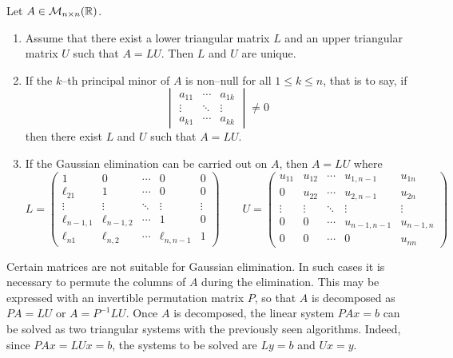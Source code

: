 \begin{theorem}
	Let $A \in \mathcal{M}_{n \times n}(\mathbb{R})$.
	\begin{enumerate}[label={(\arabic*)}, topsep=0pt]
		\item Assume that there exist a lower triangular matrix $L$ and an
		upper triangular matrix $U$ such that $A = L U$. Then $L$ and $U$ are
		unique.
        \item If the $k$--th principal minor of $A$ is non--null for all $1 \leq
        k \leq n$, that is to say, if
        \begin{equation}
            \begin{vmatrix}
                a_{11} & \cdots & a_{1k} \\
                \vdots & \ddots & \vdots \\
                a_{k1} & \cdots & a_{kk}
            \end{vmatrix} \neq 0
        \end{equation}
        then there exist $L$ and $U$ such that $A = L U$.
        \item If the Gaussian elimination can be carried out on $A$, then $A = L U$ where
		\[			
			L = 
			\begin{pmatrix}
				1 				& 0 			& \cdots & 0 				& 0  \\
				\ell_{21} 		& 1 			& \cdots & 0 				& 0 \\
				\vdots 			& \vdots 		& \ddots & \vdots 	  		& \vdots \\
				\ell_{n-1,1} 	& \ell_{n-1,2} 	& \cdots & 1 				& 0 \\
				\ell_{n1} 		& \ell_{n,2} 	& \cdots & \ell_{n,n-1} 	& 1
			\end{pmatrix}
			\qquad			
			U = 
			\begin{pmatrix}
				u_{11} 	& u_{12} & \cdots & u_{1,n-1} & u_{1n} \\
				0		& u_{22} & \cdots & u_{2,n-1} & u_{2n} \\
				\vdots	& \vdots & \ddots & \vdots 	  & \vdots \\
				0 		& 0		 & \cdots & u_{n-1,n-1} & u_{n-1,n} \\
				0 	   	& 0		 & \cdots & 0 			& u_{nn}
			\end{pmatrix}			
		\] 
	\end{enumerate}
\end{theorem}

Certain matrices are not suitable for Gaussian elimination. In such cases it is
necessary to permute the columns of $A$ during the elimination. This may be
expressed with an invertible permutation matrix $P$, so that $A$ is decomposed
as $P A = L U$ or $A = P^{-1} L U$. Once $A$ is decomposed, the linear system $P
A x = b$ can be solved as two triangular systems with the previously seen
algorithms. Indeed, since $P A x = L U x = b$, the systems to be solved are $L y
= b$ and $U x = y$. 
